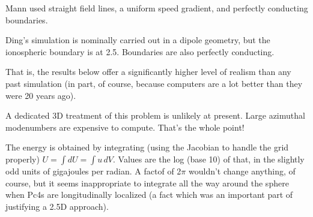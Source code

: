 Mann used straight field lines, a uniform \Alfven speed gradient, and perfectly conducting boundaries. 

Ding's simulation is nominally carried out in a dipole geometry, but the ionospheric boundary is at \SI{2.5}{\RE}. Boundaries are also perfectly conducting. 

That is, the results below offer a significantly higher level of realism than any past simulation (in part, of course, because computers are a lot better than they were 20 years ago). 

A dedicated 3D treatment of this problem is unlikely at present. Large azimuthal modenumbers are expensive to compute. That's the whole point! 




The energy is obtained by integrating (using the Jacobian to handle the grid properly) $U = \int dU = \int u \, dV$. Values are the log (base 10) of that, in the slightly odd units of gigajoules per radian. A factof of 2$\pi$ wouldn't change anything, of course, but it seems inappropriate to integrate all the way around the sphere when Pc4s are longitudinally localized (a fact which was an important part of justifying a 2.5D approach). 

